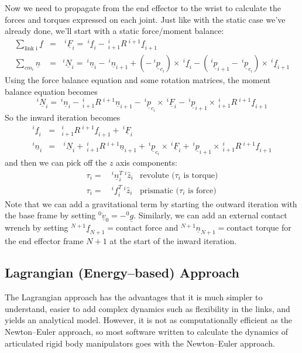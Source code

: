 \documentclass[fleqn]{article}
\begin{document}
Now we need to propagate from the end effector to the wrist to calculate the forces and torques expressed on each joint. Just like with the static case we've already done, we'll start with a static force/moment balance:
\begin{eqnarray}
	\sum_{\text{link i}} \underline{f} & = & \ ^{i}\underline{F}_{i} = \ ^{i}\underline{f}_{i} - \ ^{i}_{i+1}R\ ^{i+1}\underline{f}_{i+1} \nonumber \\
	\sum_{cm_{i}} \underline{n} & = & ^{i}\underline{N}_{i} = \ ^{i}\underline{n}_{i} - \ ^{i}\underline{n}_{i+1} + \left(-\ ^{i}\underline{p}_{c_{i}}\right)\times\ ^{i}\underline{f}_{i}-\left(\ ^{i}\underline{p}_{i+1}-\ ^{i}\underline{p}_{c_{i}}\right)\times\ ^{i}\underline{f}_{i+1} \nonumber
\end{eqnarray}
Using the force balance equation and some rotation matrices, the moment balance equation becomes
\begin{equation}
^{i}\underline{N}_{i} = \ ^{i}\underline{n}_{i}- \ ^{i}_{i+1}R\ ^{i+1}\underline{n}_{i+1} - \ ^{i}\underline{p}_{c_{i}}\times\ ^{i}\underline{F}_{i}- \ ^{i}\underline{p}_{i+1}\times\ ^{i}_{i+1}R\ ^{i+1}\underline{f}_{i+1} \nonumber
\end{equation}
So the inward iteration becomes
\begin{eqnarray}
	^{i}\underline{f}_{i} & = & ^{i}_{i+1}R\ ^{i+1}\underline{f}_{i+1} + \ ^{i}\underline{F}_{i} \\
	^{i}\underline{n}_{i} & = & \ ^{i}\underline{N}_{i} + \ ^{i}_{i+1}R\ ^{i+1}\underline{n}_{i+1} + \ ^{i}\underline{p}_{c_{i}}\times\ ^{i}\underline{F}_{i}+\ ^{i}\underline{p}_{i+1}\times\ ^{i}_{i+1}R\ ^{i+1}\underline{f}_{i+1}
\end{eqnarray}
and then we can pick off the $z$ axis components:
\begin{align}
\tau_{i} = &\ ^{i}\underline{n}_{i}^{T}\ ^{i}\hat{z}_{i} & \text{revolute ($\tau_{i}$ is torque)}\\
\tau_{i} = &\ ^{i}\underline{f}_{i}^{T}\ ^{i}\hat{z}_{i} & \text{prismatic ($\tau_{i}$ is force)}
\end{align}
Note that we can add a gravitational term by starting the outward iteration with the base frame by setting $^{0}\underline{\dot{v}}_{0}=-^{0}\underline{g}$. Similarly, we can add an external contact wrench by setting $^{N+1}\underline{f}_{N+1}= \text{contact force}$ and $^{N+1}\underline{n}_{N+1}= \text{contact torque}$ for the end effector frame $N+1$ at the start of the inward iteration.

\subsection{Lagrangian (Energy--based) Approach}
The Lagrangian approach has the advantages that it is much simpler to understand, easier to add complex dynamics such as flexibility in the links, and yields an analytical model. However, it is not as computationally efficient as the Newton--Euler approach, so most software written to calculate the dynamics of articulated rigid body manipulators goes with the Newton--Euler approach.
\end{document}
